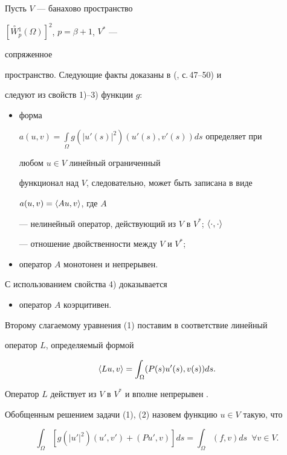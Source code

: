  


Пусть $V$ --- банахово пространство 


$[\overset{\circ}{W}{}^1_p(\Omega)]^2$, $p=\beta+1$, $V^*$ --- 


сопряженное 


пространство. Следующие факты доказаны в (\cite{1}, с.\,47--50) и 


следуют из свойств 1)--3) функции $g$: 


\begin{itemize} 


\item[a)] форма 


$a(u,v)=\int\limits_\Omega g(|u'(s)|^2)(u'(s),v'(s))ds$ определяет при 


любом $u\in V$ линейный ограниченный 


функционал над $V$, следовательно, может быть записана в виде 


$a(u,v)=\langle Au,v\rangle$, где $A$ 


--- нелинейный оператор, действующий из $V$ в $V^*$; $\langle\cdot,\cdot\rangle$ 


--- отношение двойственности между $V$ и $V^*$; 


\item[b)] оператор $A$ монотонен и непрерывен. 


\end{itemize} 


С использованием свойства 4) доказывается 


\begin{itemize} 


\item[c)] оператор $A$ коэрцитивен. 


\end{itemize} 


 


Второму слагаемому уравнения (1) поставим в соответствие линейный 


оператор $L$, определяемый формой 


$$ 


\la Lu,v\ra=\int_\Omega(P(s)u'(s),v(s))ds. 


$$ 


Оператор $L$ действует из $V$ в $V^*$ и вполне непрерывен \cite{2}. 


Обобщенным решением задачи (1), (2) назовем функцию $u\in V$ такую, что 


\begin{equation} 


\int_\Omega[g(|u'|^2)(u',v')+(P u',v)]ds= 


\int_\Omega(f,v)ds\ \; \forall v\in V. 


\end{equation} 


